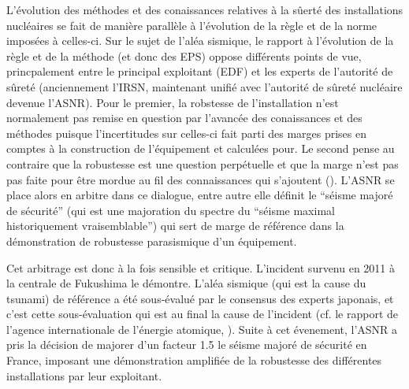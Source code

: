 L'évolution des méthodes et des conaissances relatives à la sûerté des installations nucléaires se fait de manière parallèle à l'évolution de la règle et de la norme imposées à celles-ci. 
Sur le sujet de l'aléa sismique, le rapport à l'évolution de la règle et de la méthode (et donc des EPS) oppose différents points de vue, princpalement entre le principal exploitant (EDF) et les experts de l'autorité de sûreté (anciennement l'IRSN, maintenant unifié avec l'autorité de sûreté nucléaire devenue l'ASNR). 
Pour le premier, la robstesse de l'installation n'est normalement pas remise en question par l'avancée des conaissances et des méthodes puisque l’incertitudes sur celles-ci fait parti des marges prises en comptes à la construction de l'équipement et calculées pour. Le second pense au contraire que la robustesse est une question perpétuelle et que la marge n’est pas pas faite pour être mordue au fil des connaissances qui s’ajoutent (\cite{roger_seisme_2020}). 
L'ASNR se place alors en arbitre dans ce dialogue, entre autre elle définit le ``séisme majoré de sécurité'' (qui est une majoration du spectre du ``séisme maximal historiquement vraisemblable'') qui sert de marge de référence dans la démonstration de robustesse parasismique d'un équipement. %
%


Cet arbitrage est donc à la fois sensible et critique.
L'incident survenu en 2011 à la centrale de Fukushima le démontre. L'aléa sismique (qui est la cause du tsunami) de référence
a été sous-évalué par le consensus des experts japonais, et c'est cette sous-évaluation qui est au final la cause de l'incident (cf. le rapport de l'agence internationale de l'énergie atomique, \cite{iaea_fukushima_2015}).
Suite à cet évenement, l'ASNR a pris la décision de majorer d'un facteur 1.5 le séisme majoré de sécurité en France, imposant une démonstration amplifiée de la robustesse des différentes installations par leur exploitant.




